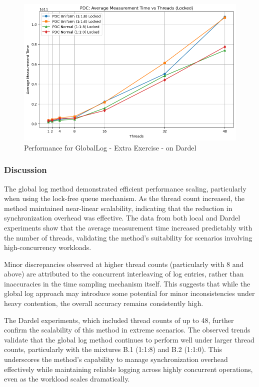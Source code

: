 \documentclass{article}
\begin{document}
\begin{figure}[H]
    \centering
    \includegraphics[width=\textwidth]{LaTex/images/Lab 3 2.5.2.4.png}
    \caption{Performance for GlobalLog - Extra Exercise - on Dardel}
    \label{fig:global-log-1-1-0}
\end{figure}

\subsubsection{Discussion}
The global log method demonstrated efficient performance scaling, particularly when using the lock-free queue mechanism. As the thread count increased, the method maintained near-linear scalability, indicating that the reduction in synchronization overhead was effective. The data from both local and Dardel experiments show that the average measurement time increased predictably with the number of threads, validating the method’s suitability for scenarios involving high-concurrency workloads.

Minor discrepancies observed at higher thread counts (particularly with 8 and above) are attributed to the concurrent interleaving of log entries, rather than inaccuracies in the time sampling mechanism itself. This suggests that while the global log approach may introduce some potential for minor inconsistencies under heavy contention, the overall accuracy remains consistently high.

The Dardel experiments, which included thread counts of up to 48, further confirm the scalability of this method in extreme scenarios. The observed trends validate that the global log method continues to perform well under larger thread counts, particularly with the mixtures B.1 (1:1:8) and B.2 (1:1:0). This underscores the method's capability to manage synchronization overhead effectively while maintaining reliable logging across highly concurrent operations, even as the workload scales dramatically.



\newpage
\printbibliography
\end{document}
